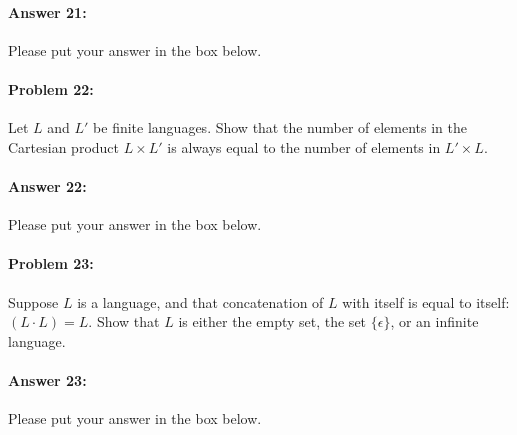 \documentclass[10pt]{article}
\newenvironment{AnswerBox}{\begin{mdframed}[style=simple]}{\end{mdframed}}
\begin{document}
\paragraph{Answer 21:} Please put your answer in the box below.

\begin{AnswerBox}%


\end{AnswerBox}%

\noindent\hrulefill %

\paragraph{Problem 22:}
Let $L$ and $L'$ be finite languages. Show that the number of elements in the
Cartesian product $L \times L'$ is always equal to the number of elements in $L'
\times L$.

\paragraph{Answer 22:} Please put your answer in the box below.

\begin{AnswerBox}%


\end{AnswerBox}%

\noindent\hrulefill %

\paragraph{Problem 23:}

Suppose $L$ is a language, and that concatenation of $L$ with itself is equal to
itself: $(L\cdot L) = L$. Show that $L$ is either the empty set,  the set
$\{\epsilon\}$, or an infinite language.

\paragraph{Answer 23:} Please put your answer in the box below.

\begin{AnswerBox}%


\end{AnswerBox}%
\end{document}
